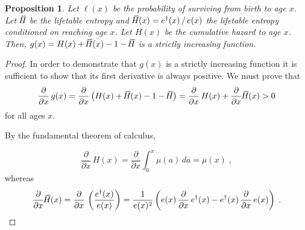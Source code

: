 \documentclass[a4paper,twoside, openright, 12pt, leqno]{article}
\newcommand*\xbar[1]{%
   \hbox{%
     \vbox{%
       \hrule height 0.5pt %
       \kern0.3ex%
       \hbox{%
         \kern-0.28em%
         \ensuremath{#1}%
         \kern-0.05em%
       }%
     }%
   }%
}
\newtheorem{theorem}{Proposition}
\begin{document}
\begin{theorem}
  Let $\ell(x)$ be the probability of surviving from birth to age $x$. Let $\,\xbar{H}$ be the lifetable entropy and $\,\xbar{H}(x)=e^\dagger(x)\,/\,e(x)$ the lifetable entropy conditioned on reaching age $x$. Let $H(x)$ be the cumulative hazard to age $x$. Then, $g(x)=H(x)+\,\xbar{H}(x)-1-\,\xbar{H}$ is a strictly increasing function.
 \label{prop2}
\end{theorem}

\begin{proof}
In order to demonstrate that $g(x)$ is a strictly increasing function it is sufficient to show that its first derivative is always positive. We must prove that
%
\begin{equation}
 \frac{\partial}{\partial x}\,g(x)=\frac{\partial}{\partial x}\left(H(x)+\,\xbar{H}(x)-1-\,\xbar{H}\right)=\frac{\partial}{\partial x}\,H(x)+\frac{\partial}{\partial x}\,\xbar{H}(x)>0
 \label{eq:prop2}
\end{equation}
%
for all ages $x$. 

By the fundamental theorem of calculus,

\begin{equation}
  \frac{\partial}{\partial x}\,H(x) = \frac{\partial }{\partial x} \int_0^x\mu(a)\,da =\mu(x)\;,
  \label{Cumhaz.derv}
\end{equation}
%
whereas
%
\begin{equation*}
  \frac{\partial}{\partial x}\,\xbar{H}(x)= \frac{\partial}{\partial x}\,\left(\frac{e^\dagger(x)}{e(x)}\right)= \frac{1}{e(x)^2}\left(e(x)\,\frac{\partial}{\partial x}\,e^\dagger(x)-e^\dagger(x)\,\frac{\partial}{\partial x}\,e(x)\right)\;.
\end{equation*}


\end{proof}
\end{document}
